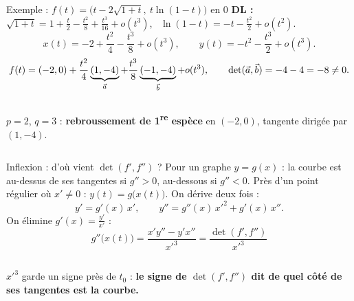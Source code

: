\documentclass[aspectratio=169,11pt]{beamer}
\begin{document}
\begin{frame}{Exemple : $f(t)=\big(t-2\sqrt{1+t},\ t\ln(1-t)\big)$ en $0$}
\pause
\textbf{DL :} $\sqrt{1+t}=1+\frac t2-\frac{t^2}8+\frac{t^3}{16}+o(t^3)$, \ $\ln(1-t)=-t-\frac{t^2}2+o(t^2)$.
\pause
\[x(t)=-2+\frac{t^2}4-\frac{t^3}8+o(t^3),\qquad y(t)=-t^2-\frac{t^3}2+o(t^3).\]
\pause
\[f(t)=(-2,0)+\frac{t^2}4\underbrace{(1,-4)}_{\vec{a}}+\frac{t^3}8\underbrace{(-1,-4)}_{\vec{b}}+o(t^3),\qquad
\det(\vec{a},\vec{b})=-4-4=-8\neq0.\]
\pause
\begin{columns}[c]
\begin{RETENIR}
$p=2$, $q=3$ : \textbf{rebroussement de 1\textsuperscript{re} espèce} en $(-2,0)$, tangente dirigée par $(1,-4)$.
\end{RETENIR}
\centering
{}
\end{columns}
\end{frame}

\begin{frame}{Inflexion : d'où vient $\det(f',f'')$ ?}
Pour un graphe $y=g(x)$ : la courbe est au-dessus de ses tangentes si $g''>0$, au-dessous si $g''<0$.
\pause
Près d'un point régulier où $x'\neq0$ : $y(t)=g\big(x(t)\big)$. On dérive deux fois :
\[y'=g'(x)\,x',\qquad y''=g''(x)\,x'^2+g'(x)\,x''.\]
\pause
On élimine $g'(x)=\frac{y'}{x'}$ :
\[\boxed{\ g''\big(x(t)\big)=\frac{x'y''-y'x''}{x'^3}=\frac{\det(f',f'')}{x'^3}\ }\]
\pause
\begin{columns}[c]
$x'^3$ garde un signe près de $t_0$ : \textbf{le signe de $\det(f',f'')$ dit de quel côté de ses tangentes est la courbe.}
\centering{}
\end{columns}
\end{frame}
\end{document}
